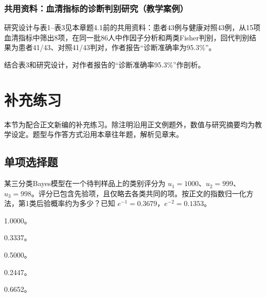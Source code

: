 \subsubsection*{共用资料：血清指标的诊断判别研究（教学案例）}

研究设计与表1--表3见本章题4.1前的共用资料：患者43例与健康对照43例，从15项血清指标中筛出8项，在同一批86人中作因子分析和两类Fisher判别，回代判别结果为患者41/43、对照41/43判对，作者报告``诊断准确率为95.3\%''。

\par\addvspace{6pt}\noindent\begin{minipage}{\linewidth}


结合表3和研究设计，对作者报告的``诊断准确率95.3\%''作剖析。


\end{minipage}\par\vspace{4pt}

\clearpage\section{补充练习}

本节为配合正文新编的补充练习。除注明沿用正文例题外，数值与研究摘要均为教学设定。题型与作答方式沿用本章往年题，解析见章末。

\par\addvspace{6pt}\noindent\begin{minipage}{\linewidth}

\subsection{单项选择题}


某三分类Bayes模型在一个待判样品上的类别评分为 \(u_1=1000\)、\(u_2=999\)、\(u_3=998\)。评分已包含先验项，且仅略去各类共同的项。按正文的指数归一化方法，第1类后验概率约为多少？已知 \(e^{-1}=0.3679\)，\(e^{-2}=0.1353\)。


\begin{choices}

\item 1.0000。

\item 0.3337。

\item 0.5000。

\item 0.2447。

\item 0.6652。

\end{choices}

\end{minipage}\par\vspace{4pt}

